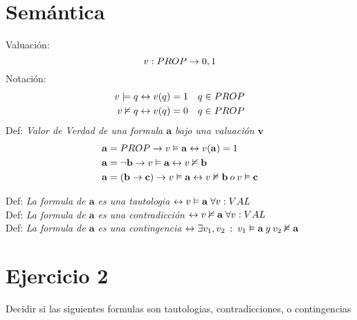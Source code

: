 \documentclass[14pt,a4paper,fleqn]{article}
\begin{document}
\section*{Semántica}
Valuación:
\begin{equation*}
	v:PROP \rightarrow {0,1}
\end{equation*}
Notación:
\begin{align*}
	v \models q &\leftrightarrow v(q)=1 & q \in PROP \\
	v \nvDash q &\leftrightarrow v(q)=0 & q \in PROP
\end{align*}
Def: \textit{Valor de Verdad de una formula $\mathbf{a}$ bajo una valuación $\mathbf{v}$}
\begin{align*}
	\mathbf{a} &= PROP \rightarrow v \vDash \mathbf{a} \leftrightarrow v(\mathbf{a})=1 \\
	\mathbf{a} &= \neg \mathbf{b} \rightarrow v \vDash \mathbf{a} \leftrightarrow v \nvDash \mathbf{b} \\
	\mathbf{a} &= (\mathbf{b} \rightarrow \mathbf{c}) \rightarrow v \vDash \mathbf{a} \leftrightarrow v \nvDash \mathbf{b} \: o \: v \vDash \mathbf{c}
\end{align*}

Def: \textit{La formula de $\mathbf{a}$ es una tautologia $\leftrightarrow v \vDash \mathbf{a}\; \forall v:VAL$} \\
Def: \textit{La formula de $\mathbf{a}$ es una contradicción $\leftrightarrow v \nvDash \mathbf{a}\; \forall v:VAL$} \\
Def: \textit{La formula de $\mathbf{a}$ es una contingencia $\leftrightarrow \exists v_{1}, v_{2}\: : \: v_{1} \vDash \mathbf{a} \: y\: v_{2} \nvDash \mathbf{a}$} \\

\section*{Ejercicio 2}
\noindent Decidir si las siguientes formulas son tautologias, contradicciones, o contingencias
\end{document}
